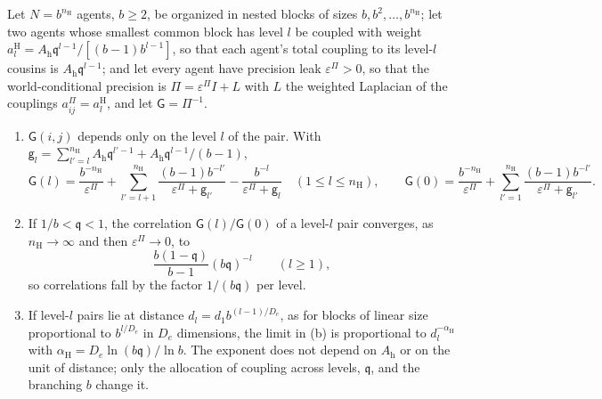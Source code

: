 \begin{proposition}\label{prop:abs-hierarchy}
Let $N=b^{n_{\mathrm H}}$ agents, $b\ge2$, be organized in nested blocks of sizes $b,b^2,\dots,b^{n_{\mathrm H}}$; let two agents whose smallest common block has level $l$ be coupled with weight $a^{\mathrm H}_l=A_{\mathrm h}\mathfrak q^{l-1}/[(b-1)b^{l-1}]$, so that each agent's total coupling to its level-$l$ cousins is $A_{\mathrm h}\mathfrak q^{l-1}$; and let every agent have precision leak $\varepsilon^\Pi>0$, so that the world-conditional precision is $\Pi=\varepsilon^\Pi I+L$ with $L$ the weighted Laplacian of the couplings $a^\Pi_{ij}=a^{\mathrm H}_l$, and let $\mathsf G=\Pi^{-1}$.
\begin{enumerate}
\item[(a)] $\mathsf G(i,j)$ depends only on the level $l$ of the pair. With $\mathsf g_l=\sum_{l'=l}^{n_{\mathrm H}}A_{\mathrm h}\mathfrak q^{l'-1}+A_{\mathrm h}\mathfrak q^{l-1}/(b-1)$,
\[
\mathsf G(l)=\frac{b^{-n_{\mathrm H}}}{\varepsilon^\Pi}+\sum_{l'=l+1}^{n_{\mathrm H}}\frac{(b-1)b^{-l'}}{\varepsilon^\Pi+\mathsf g_{l'}}-\frac{b^{-l}}{\varepsilon^\Pi+\mathsf g_l}\quad(1\le l\le n_{\mathrm H}),\qquad\mathsf G(0)=\frac{b^{-n_{\mathrm H}}}{\varepsilon^\Pi}+\sum_{l'=1}^{n_{\mathrm H}}\frac{(b-1)b^{-l'}}{\varepsilon^\Pi+\mathsf g_{l'}}.
\]
\item[(b)] If $1/b<\mathfrak q<1$, the correlation $\mathsf G(l)/\mathsf G(0)$ of a level-$l$ pair converges, as $n_{\mathrm H}\to\infty$ and then $\varepsilon^\Pi\to0$, to
\[
\frac{b(1-\mathfrak q)}{b-1}(b\mathfrak q)^{-l}\qquad(l\ge1),
\]
so correlations fall by the factor $1/(b\mathfrak q)$ per level.
\item[(c)] If level-$l$ pairs lie at distance $d_l=d_1b^{(l-1)/D_e}$, as for blocks of linear size proportional to $b^{l/D_e}$ in $D_e$ dimensions, the limit in (b) is proportional to $d_l^{-\alpha_{\mathrm H}}$ with $\alpha_{\mathrm H}=D_e\ln(b\mathfrak q)/\ln b$. The exponent does not depend on $A_{\mathrm h}$ or on the unit of distance; only the allocation of coupling across levels, $\mathfrak q$, and the branching $b$ change it.
\end{enumerate}
\end{proposition}

